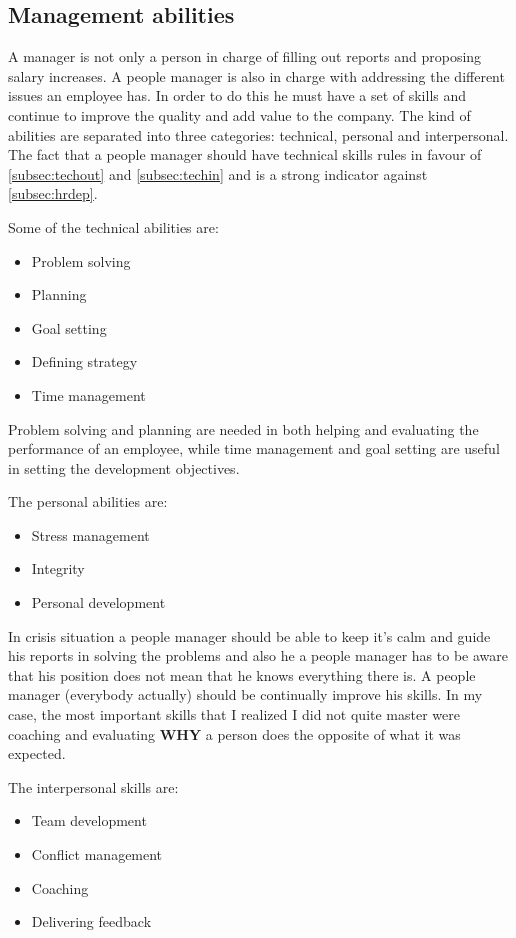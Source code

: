 \subsection{Management abilities}
A manager is not only a person in charge of filling out reports and proposing salary increases. A people manager is also in charge with addressing the different issues an employee has. In order to do this he must have a set of skills and continue to improve the quality and add value to the company. The kind of abilities are separated into three categories: technical, personal and interpersonal. The fact that a people manager should have technical skills rules in favour of \cref{subsec:techout} and \cref{subsec:techin} and is a strong indicator against \cref{subsec:hrdep}.

Some of the technical abilities are:
\begin{itemize}
\item Problem solving
\item Planning
\item Goal setting
\item Defining strategy
\item Time management
\end{itemize}

Problem solving and planning are needed in both helping and evaluating the performance of an employee, while time management and goal setting are useful in setting the development objectives.

The personal abilities are:
\begin{itemize}
\item Stress management
\item Integrity
\item Personal development
\end{itemize}

In crisis situation a people manager should be able to keep it's calm and guide his reports in solving the problems and also he a people manager has to be aware that his position does not mean that he knows everything there is. A people manager (everybody actually) should be continually improve his skills. In my case, the most important skills that I realized I did not quite master were coaching and evaluating \textbf{WHY} a person does the opposite of what it was expected.

The interpersonal skills are:
\begin{itemize}
\item Team development
\item Conflict management 
\item Coaching
\item Delivering feedback
\end{itemize}


